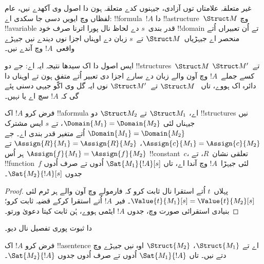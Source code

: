 \documentclass[../../../include/open-logic-section]{subfiles}
\begin{document}


\begin{explain}
غیر متعلقہ علامتاں توں آزادی، جیہنوں کدے متعلقہ ہون دا اصول وی
آکھدے نیں، عام لفظاں وچ ایویں دسی جا سکدی اے: !!{formula}~$!A$
دا !!a{structure}~$\Struct M$ وچ !!a{variable} قدر بندی~$s$
دے لحاظ نال پورا اترنا صرف خود !!{domain} تے اُن
تعبیراں اُتے منحصر اے جیہڑیاں~$\Struct M$ تے~$s$ زبان دے
اوہناں اجزا نوں دیندے نیں جیہڑے واقعی~$!A$ وچ آندے نیں۔

ایس اصول دا اک سیدھا نتیجہ ایہ اے: جے دو !!{structure}s~$\Struct M$
تے~$\Struct M'$ کسے جملے~$!A$ وچ آون والے زبان دے سارے اجزا
دی تعبیر اُتے متفق ہون تے اوہناں دا دائرہ اک ہووے، تاں
~$\Struct M$ تے~$\Struct M'$ نوں ایہ گل وی اکّو جیہی دسنی
پئے گی کہ $!A$ سچ اے یا نہیں۔
\end{explain}

\begin{prop}
  فرض کرو $!A$ اک !!a{formula} اے، $\Struct M_1$ تے $\Struct M_2$
  دو !!{structure}s نیں جیہناں لئی $\Domain{M_1} = \Domain{M_2}$،
  تے $s$ ایس مشترک $\Domain{M_1} = \Domain{M_2}$ اُتے متغیر
  قدر بندی اے۔ جے $\Assign{c}{M_1} = \Assign{c}{M_2}$،
  $\Assign{R}{M_1}=\Assign{R}{M_2}$ تے
  $\Assign{f}{M_1} = \Assign{f}{M_2}$ ہر اُس !!{constant}~$c$،
  تعلقی نشان~$R$، تے !!{function}~$f$ لئی جیہڑا~$!A$ وچ آندا اے،
  تاں $\Sat{M_1}{!A}[s]$ اُدوں تے صرف اُدوں جدوں
  $\Sat{M_2}{!A}[s]$۔
\end{prop}

\begin{proof}
  پہلاں~$t$ اُتے استقرا نال ثابت کرو کہ فارمولے وچ آون والے ہر ٹرم لئی
  $\Value{t}{M_1}[s] = \Value{t}{M_2}[s]$۔ فیر~$!A$ اُتے
  استقرا کرکے قضیہ ثابت کرو؛ بنیادی استقرائی صورت وچ، جدوں $!A$
  ایٹمی ہووے، ہُن ثابت کیتا دعویٰ ورتو۔
\end{proof}

\begin{prob}
 دا ثبوت پوری تفصیل نال
دیو۔
\end{prob}

\begin{cor}
  فرض کرو $!A$ اک !!a{sentence} اے تے $\Struct{M_1}$، $\Struct{M_2}$
  اوہ نیں جیہڑے  وچ دتے نیں۔ تاں
  $\Sat{M_1}{!A}$ اُدوں تے صرف اُدوں جدوں $\Sat{M_2}{!A}$۔
\end{cor}
\end{document}
